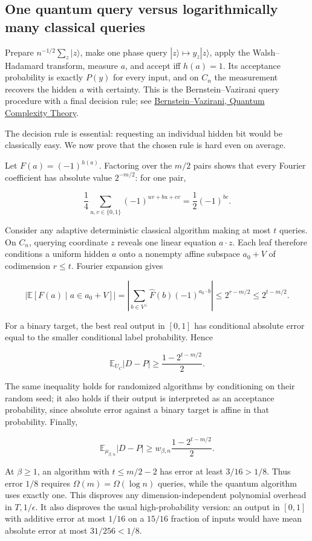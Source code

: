 \subsection{One quantum query versus logarithmically many classical queries}\label{qm:one-quantum-query-versus-logarithmically-many-classical-queries}

Prepare \(n^{-1/2}\sum_z|z\rangle\), make one phase query \(|z\rangle\mapsto y_z|z\rangle\), apply the Walsh--Hadamard transform, measure \(a\), and accept iff \(h(a)=1\). Its acceptance probability is exactly \(P(y)\) for every input, and on \(C_n\) the measurement recovers the hidden \(a\) with certainty. This is the Bernstein--Vazirani query procedure with a final decision rule; see \href{https://epubs.siam.org/doi/10.1137/S0097539796300921}{Bernstein--Vazirani, Quantum Complexity Theory}.

The decision rule is essential: requesting an individual hidden bit would be classically easy. We now prove that the chosen rule is hard even on average.

Let \(F(a)=(-1)^{h(a)}\). Factoring over the \(m/2\) pairs shows that every Fourier coefficient has absolute value \(2^{-m/2}\): for one pair,

\[
\frac14\sum_{u,v\in\{0,1\}}(-1)^{uv+bu+cv}=\frac12(-1)^{bc}.
\]

Consider any adaptive deterministic classical algorithm making at most \(t\) queries. On \(C_n\), querying coordinate \(z\) reveals one linear equation \(a\cdot z\). Each leaf therefore conditions a uniform hidden \(a\) onto a nonempty affine subspace \(a_0+V\) of codimension \(r\le t\). Fourier expansion gives

\[
\left|\mathbb E[F(a)\mid a\in a_0+V]\right|
=\left|\sum_{b\in V^\perp}\widehat F(b)(-1)^{a_0\cdot b}\right|
\le2^{r-m/2}\le2^{t-m/2}.
\]

For a binary target, the best real output in \([0,1]\) has conditional absolute error equal to the smaller conditional label probability. Hence

\[
\mathbb E_{U_C}|D-P|\ge\frac{1-2^{t-m/2}}2.
\]

The same inequality holds for randomized algorithms by conditioning on their random seed; it also holds if their output is interpreted as an acceptance probability, since absolute error against a binary target is affine in that probability. Finally,

\[
\boxed{\displaystyle
\mathbb E_{\mu_{\beta,n}}|D-P|
\ge w_{\beta,n}\frac{1-2^{t-m/2}}2.}
\]

At \(\beta\ge1\), an algorithm with \(t\le m/2-2\) has error at least \(3/16>1/8\). Thus error \(1/8\) requires \(\Omega(m)=\Omega(\log n)\) queries, while the quantum algorithm uses exactly one. This disproves any dimension-independent polynomial overhead in \(T,1/\epsilon\). It also disproves the usual high-probability version: an output in \([0,1]\) with additive error at most \(1/16\) on a \(15/16\) fraction of inputs would have mean absolute error at most \(31/256<1/8\).
